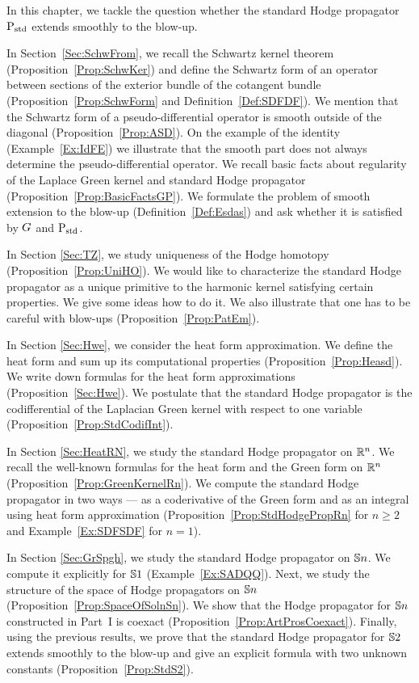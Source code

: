 \documentclass[\MainFolder/Text.tex]{subfiles}
\begin{document}
In this chapter, we tackle the question whether the standard Hodge propagator $\mathrm{P}_{\mathrm{std}}$ extends smoothly to the blow-up.

In Section~\ref{Sec:SchwFrom}, we recall the Schwartz kernel theorem (Proposition~\ref{Prop:SchwKer}) and define the Schwartz form of an operator between sections of the exterior bundle of the cotangent bundle (Proposition~\ref{Prop:SchwForm} and Definition~\ref{Def:SDFDF}). We mention that the Schwartz form of a pseudo-differential operator is smooth outside of the diagonal (Proposition~\ref{Prop:ASD}). On the example of the identity (Example~\ref{Ex:IdFE}) we illustrate that the smooth part does not always determine the pseudo-differential operator. We recall basic facts about regularity of the Laplace Green kernel and standard Hodge propagator (Proposition~\ref{Prop:BasicFactsGP}). We formulate the problem of smooth extension to the blow-up (Definition~\ref{Def:Esdas}) and ask whether it is satisfied by $G$ and $\mathrm{P}_{\mathrm{std}}$.

In Section \ref{Sec:TZ}, we study uniqueness of the Hodge homotopy (Proposition~\ref{Prop:UniHO}). We would like to characterize the standard Hodge propagator as a unique primitive to the harmonic kernel satisfying certain properties. We give some ideas how to do it. We also illustrate that one has to be careful with blow-ups (Proposition~\ref{Prop:PatEm}).

In Section \ref{Sec:Hwe}, we consider the heat form approximation. We define the heat form and sum up its computational properties (Proposition~\ref{Prop:Heasd}). We write down formulas for the heat form approximations (Proposition~\ref{Sec:Hwe}). We postulate that the standard Hodge propagator is the codifferential of the Laplacian Green kernel with respect to one variable (Proposition~\ref{Prop:StdCodifInt}).

In Section \ref{Sec:HeatRN}, we study the standard Hodge propagator on $\mathbb{R}^n$. We recall the well-known formulas for the heat form and the Green form on $\mathbb{R}^n$ (Proposition~\ref{Prop:GreenKernelRn}). We compute the standard Hodge propagator in two ways --- as a coderivative of the Green form and as an integral using heat form approximation (Proposition~\ref{Prop:StdHodgePropRn} for $n\ge 2$ and Example~\ref{Ex:SDFSDF} for $n=1$).

In Section \ref{Sec:GrSpgh}, we study the standard Hodge propagator on $\mathbb{S}{n}$. We compute it explicitly for $\mathbb{S}{1}$ (Example~\ref{Ex:SADQQ}). Next, we study the structure of the space of Hodge propagators on $\mathbb{S}{n}$ (Proposition~\ref{Prop:SpaceOfSolnSn}). We show that the Hodge propagator for $\mathbb{S}{n}$ constructed in Part~I is coexact (Proposition~\ref{Prop:ArtProsCoexact}). Finally, using the previous results, we prove that the standard Hodge propagator for $\mathbb{S}{2}$ extends smoothly to the blow-up and give an explicit formula with two unknown constants (Proposition~\ref{Prop:StdS2}).
\end{document}
